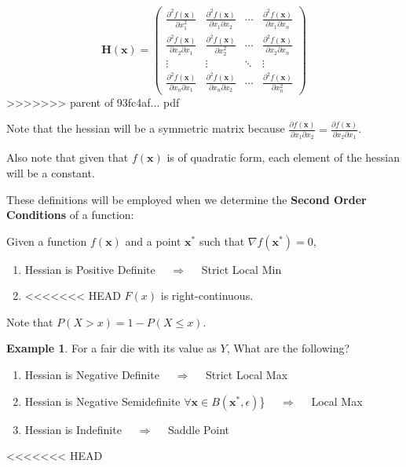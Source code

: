 \documentclass[]{book}
\providecommand{\tightlist}{%
  \setlength{\itemsep}{0pt}\setlength{\parskip}{0pt}}
\theoremstyle{definition}
\theoremstyle{definition}
\newtheorem{example}{Example}[chapter]
\theoremstyle{definition}
\theoremstyle{remark}
\begin{document}
\[\mathbf{H(x)}=\begin{pmatrix}
\frac{\partial^2 f(\mathbf{x})}{\partial x_1^2}&\frac{\partial^2f(\mathbf{x})}{\partial x_1 \partial x_2}&
\cdots & \frac{\partial^2 f(\mathbf{x})}{\partial x_1 \partial x_n}\\[9pt]
\frac{\partial^2 f(\mathbf{x})}{\partial x_2 \partial x_1}&\frac{\partial^2f(\mathbf{x})}{\partial x_2^2}&
\cdots & \frac{\partial^2 f(\mathbf{x})}{\partial x_2 \partial x_n}\\
\vdots & \vdots & \ddots & \vdots \\[3pt]
\frac{\partial^2 f(\mathbf{x})}{\partial x_n \partial x_1}&\frac{\partial^2f(\mathbf{x})}{\partial x_n \partial x_2}&
\cdots & \frac{\partial^2 f(\mathbf{x})}{\partial x_n^2}\end{pmatrix}\]
>>>>>>> parent of 93fc4af... pdf

Note that the hessian will be a symmetric matrix because \(\frac{\partial f(\mathbf{x})}{\partial x_1\partial x_2} = \frac{\partial f(\mathbf{x})}{\partial x_2\partial x_1}\).

Also note that given that \(f(\mathbf{x})\) is of quadratic form, each element of the hessian will be a constant.

These definitions will be employed when we determine the \textbf{Second Order Conditions} of a function:

Given a function \(f(\mathbf{x})\) and a point \(\mathbf{x}^*\) such that \(\nabla f(\mathbf{x}^*)=0\),

\begin{enumerate}
\def\labelenumi{\arabic{enumi}.}
\tightlist
\item
  Hessian is Positive Definite \(\quad \Longrightarrow \quad\) Strict Local Min
\item
<<<<<<< HEAD
  \(F(x)\) is right-continuous.
\end{enumerate}

Note that \(P(X > x) = 1 - P(X \le x)\).

\begin{example}
\protect\hypertarget{exm:unnamed-chunk-77}{}{\label{exm:unnamed-chunk-77} }For a fair die with its value as \(Y\), What are the following?

\begin{enumerate}
\def\labelenumi{\arabic{enumi}.}
\tightlist
=======
  Hessian is Positive Semidefinite \(\forall \mathbf{x}\in B(\mathbf{x}^*,\epsilon)\)\} \(\quad \Longrightarrow \quad\) Local Min
>>>>>>> parent of 93fc4af... pdf
\item
  Hessian is Negative Definite \(\quad \Longrightarrow \quad\) Strict Local Max
\item
  Hessian is Negative Semidefinite \(\forall \mathbf{x}\in B(\mathbf{x}^*,\epsilon)\)\} \(\quad \Longrightarrow \quad\) Local Max
\item
  Hessian is Indefinite \(\quad \Longrightarrow \quad\) Saddle Point
\end{enumerate}
<<<<<<< HEAD
\end{example}
\end{document}
